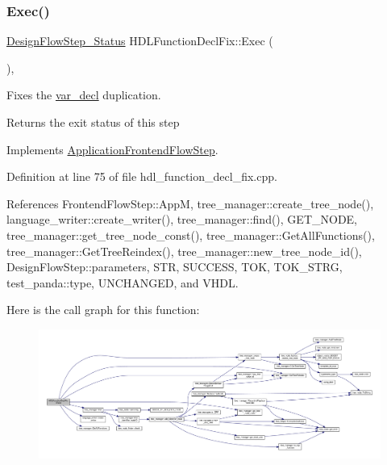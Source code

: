\mbox{\label{classHDLFunctionDeclFix_aea64c6af343b3a2cebbfd0dda66cb1e1}} 
\subsubsection{\texorpdfstring{Exec()}{Exec()}}
{\footnotesize\ttfamily \hyperlink{design__flow__step_8hpp_afb1f0d73069c26076b8d31dbc8ebecdf}{Design\+Flow\+Step\+\_\+\+Status} H\+D\+L\+Function\+Decl\+Fix\+::\+Exec (\begin{DoxyParamCaption}{ }\end{DoxyParamCaption})\hspace{0.3cm}{\ttfamily [override]}, {\ttfamily [virtual]}}



Fixes the \hyperlink{structvar__decl}{var\+\_\+decl} duplication. 

\begin{DoxyReturn}{Returns}
the exit status of this step 
\end{DoxyReturn}


Implements \hyperlink{classApplicationFrontendFlowStep_a2bf060a5ebc1735635dc5c7773387a25}{Application\+Frontend\+Flow\+Step}.



Definition at line 75 of file hdl\+\_\+function\+\_\+decl\+\_\+fix.\+cpp.



References Frontend\+Flow\+Step\+::\+AppM, tree\+\_\+manager\+::create\+\_\+tree\+\_\+node(), language\+\_\+writer\+::create\+\_\+writer(), tree\+\_\+manager\+::find(), G\+E\+T\+\_\+\+N\+O\+DE, tree\+\_\+manager\+::get\+\_\+tree\+\_\+node\+\_\+const(), tree\+\_\+manager\+::\+Get\+All\+Functions(), tree\+\_\+manager\+::\+Get\+Tree\+Reindex(), tree\+\_\+manager\+::new\+\_\+tree\+\_\+node\+\_\+id(), Design\+Flow\+Step\+::parameters, S\+TR, S\+U\+C\+C\+E\+SS, T\+OK, T\+O\+K\+\_\+\+S\+T\+RG, test\+\_\+panda\+::type, U\+N\+C\+H\+A\+N\+G\+ED, and V\+H\+DL.

Here is the call graph for this function\+:
\nopagebreak
\begin{figure}[H]
\begin{center}
\leavevmode
\includegraphics[width=350pt]{dc/d52/classHDLFunctionDeclFix_aea64c6af343b3a2cebbfd0dda66cb1e1_cgraph}
\end{center}
\end{figure}


